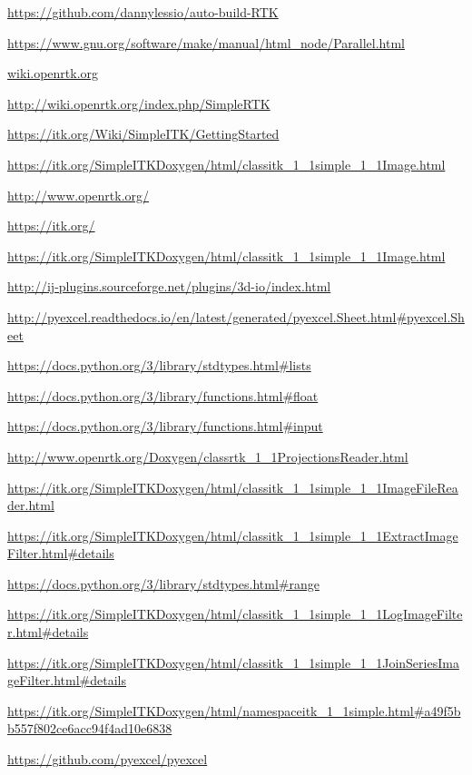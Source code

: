 \documentclass[a4paper,12pt, doubleside]{report}
\begin{document}
\begin{thebibliography}{1}
        \url{https://github.com/dannylessio/auto-build-RTK}

        \url{https://www.gnu.org/software/make/manual/html_node/Parallel.html}

        \url{wiki.openrtk.org}

        \url{http://wiki.openrtk.org/index.php/SimpleRTK}
    
        \url{https://itk.org/Wiki/SimpleITK/GettingStarted}
    
        \url{https://itk.org/SimpleITKDoxygen/html/classitk_1_1simple_1_1Image.html}
    
    
        \url{http://www.openrtk.org/}
    
        \url{https://itk.org/}
        
        \url{https://itk.org/SimpleITKDoxygen/html/classitk_1_1simple_1_1Image.html}

        \url{http://ij-plugins.sourceforge.net/plugins/3d-io/index.html}
        
        \url{http://pyexcel.readthedocs.io/en/latest/generated/pyexcel.Sheet.html#pyexcel.Sheet}
        
        \url{https://docs.python.org/3/library/stdtypes.html#lists}
        
        \url{https://docs.python.org/3/library/functions.html#float}
        
        \url{https://docs.python.org/3/library/functions.html#input}
        
        \url{http://www.openrtk.org/Doxygen/classrtk_1_1ProjectionsReader.html}
    
        \url{https://itk.org/SimpleITKDoxygen/html/classitk_1_1simple_1_1ImageFileReader.html}
    
        \url{https://itk.org/SimpleITKDoxygen/html/classitk_1_1simple_1_1ExtractImageFilter.html#details}
    
        \url{https://docs.python.org/3/library/stdtypes.html#range}
        
        \url{https://itk.org/SimpleITKDoxygen/html/classitk_1_1simple_1_1LogImageFilter.html#details}
        
        \url{https://itk.org/SimpleITKDoxygen/html/classitk_1_1simple_1_1JoinSeriesImageFilter.html#details}
        
        \url{https://itk.org/SimpleITKDoxygen/html/namespaceitk_1_1simple.html#a49f5bb557f802ce6acc94f4ad10e6838}
        
        \url{https://github.com/pyexcel/pyexcel}
    
    \end{thebibliography}
\end{document}

